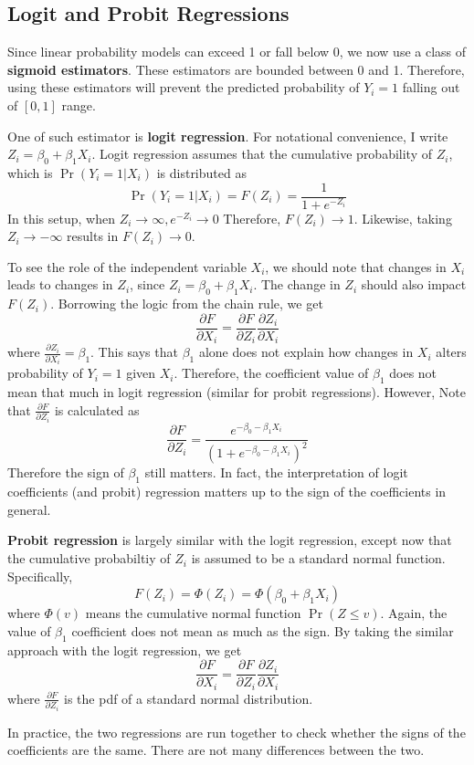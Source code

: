 \documentclass[12pt]{article}
\theoremstyle{definition}
\theoremstyle{property}
\theoremstyle{assumption}
\theoremstyle{example}
\theoremstyle{comment}
\begin{document}
\subsection{Logit and Probit Regressions}
Since linear probability models can exceed 1 or fall below 0, we now use a class of \textbf{sigmoid estimators}. These estimators are bounded between 0 and 1. Therefore, using these estimators will prevent the predicted probability of $Y_i=1$ falling out of $[0,1]$ range. \par\medskip
One of such estimator is \textbf{logit regression}. For notational convenience, I write $Z_i=\beta_0+\beta_1X_i$. Logit regression assumes that the cumulative probability of $Z_i$, which is $\Pr(Y_i=1|X_i)$  is distributed as
\[
\Pr(Y_i=1|X_i)=F(Z_i)=\frac{1}{1+e^{-Z_i}}
\]
In this setup, when $Z_i\to\infty, e^{-Z_i}\to0$ Therefore, $F(Z_i)\to1$. Likewise, taking $Z_i\to-\infty$ results in $F(Z_i)\to0$. \par\medskip
To see the role of the independent variable $X_i$, we should note that changes in $X_i$ leads to changes in $Z_i$, since $Z_i = \beta_0+\beta_1X_i$. The change in $Z_i$ should also impact $F(Z_i)$. Borrowing the logic from the chain rule, we get
\[
\frac{\partial F}{\partial X_i} = \frac{\partial F}{\partial Z_i}\frac{\partial Z_i}{\partial X_i}  
\]
where $\frac{\partial Z_i}{\partial X_i}  =\beta_1$. This says that $\beta_1$ alone does not explain how changes in $X_i$ alters probability of $Y_i=1$ given $X_i$.  Therefore, the coefficient value of $\beta_1$ does not mean that much in logit regression (similar for probit regressions). However, Note that $ \frac{\partial F}{\partial Z_i}$ is calculated as
\[
 \frac{\partial F}{\partial Z_i}=\frac{e^{-\beta_0 -\beta_1X_i}}{(1+e^{-\beta_0 -\beta_1X_i})^2}
\]
Therefore the sign of $\beta_1$ still matters. In fact, the interpretation of logit coefficients (and probit) regression matters up to the sign of the coefficients in general. \par\medskip
\textbf{Probit regression} is largely similar with the logit regression, except now that the cumulative probabiltiy of $Z_i$ is assumed to be a standard normal function. Specifically, 
\[
F(Z_i)= \Phi(Z_i)=\Phi(\beta_0+\beta_1X_i)
\]
where $\Phi(v)$ means the cumulative normal function $\Pr(Z\leq v)$. Again, the value of $\beta_1$ coefficient does not mean as much as the sign. By taking the similar approach with the logit regression, we get
\[
\frac{\partial F}{\partial X_i} = \frac{\partial F}{\partial Z_i}\frac{\partial Z_i}{\partial X_i} 
\]
 where $\frac{\partial F}{\partial Z_i}$ is the pdf of a standard normal distribution. \par\medskip
In practice, the two regressions are run together to check whether the signs of the coefficients are the same. There are not many differences between the two.\par\medskip
\end{document}

